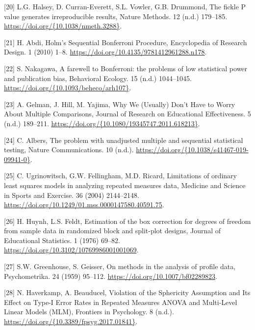 \documentclass[
]{article}
\begin{document}
\leavevmode\hypertarget{ref-halsey2015}{}%
{[}20{]} L.G. Halsey, D. Curran-Everett, S.L. Vowler, G.B. Drummond, The fickle P value generates irreproducible results, Nature Methods. 12 (n.d.) 179--185. \href{https://doi.org/\%7B10.1038/nmeth.3288\%7D}{https://doi.org/\{10.1038/nmeth.3288\}}.

\leavevmode\hypertarget{ref-abdi2010}{}%
{[}21{]} H. Abdi, Holm's Sequential Bonferroni Procedure, Encyclopedia of Research Design. 1 (2010) 1--8. \url{https://doi.org/10.4135/9781412961288.n178}.

\leavevmode\hypertarget{ref-nakagawa2004}{}%
{[}22{]} S. Nakagawa, A farewell to Bonferroni: the problems of low statistical power and publication bias, Behavioral Ecology. 15 (n.d.) 1044--1045. \href{https://doi.org/\%7B10.1093/beheco/arh107\%7D}{https://doi.org/\{10.1093/beheco/arh107\}}.

\leavevmode\hypertarget{ref-gelman2012}{}%
{[}23{]} A. Gelman, J. Hill, M. Yajima, Why We (Usually) Don't Have to Worry About Multiple Comparisons, Journal of Research on Educational Effectiveness. 5 (n.d.) 189--211. \href{https://doi.org/\%7B10.1080/19345747.2011.618213\%7D}{https://doi.org/\{10.1080/19345747.2011.618213\}}.

\leavevmode\hypertarget{ref-albers2019}{}%
{[}24{]} C. Albers, The problem with unadjusted multiple and sequential statistical testing, Nature Communications. 10 (n.d.). \href{https://doi.org/\%7B10.1038/s41467-019-09941-0\%7D}{https://doi.org/\{10.1038/s41467-019-09941-0\}}.

\leavevmode\hypertarget{ref-ugrinowitsch2004}{}%
{[}25{]} C. Ugrinowitsch, G.W. Fellingham, M.D. Ricard, Limitations of ordinary least squares models in analyzing repeated measures data, Medicine and Science in Sports and Exercise. 36 (2004) 2144--2148. \url{https://doi.org/10.1249/01.mss.0000147580.40591.75}.

\leavevmode\hypertarget{ref-huynh1976}{}%
{[}26{]} H. Huynh, L.S. Feldt, Estimation of the box correction for degrees of freedom from sample data in randomized block and split-plot designs, Journal of Educational Statistics. 1 (1976) 69--82. \url{https://doi.org/10.3102/10769986001001069}.

\leavevmode\hypertarget{ref-greenhouse1959}{}%
{[}27{]} S.W. Greenhouse, S. Geisser, On methods in the analysis of profile data, Psychometrika. 24 (1959) 95--112. \url{https://doi.org/10.1007/bf02289823}.

\leavevmode\hypertarget{ref-haverkamp2017}{}%
{[}28{]} N. Haverkamp, A. Beauducel, Violation of the Sphericity Assumption and Its Effect on Type-I Error Rates in Repeated Measures ANOVA and Multi-Level Linear Models (MLM), Frontiers in Psychology. 8 (n.d.). \href{https://doi.org/\%7B10.3389/fpsyg.2017.01841\%7D}{https://doi.org/\{10.3389/fpsyg.2017.01841\}}.
\end{document}
